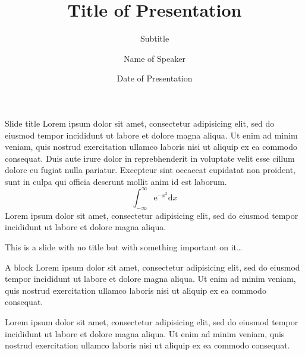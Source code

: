 \documentclass[aspectratio=169]{beamer}
\title[Short Title]{Title of Presentation}
\subtitle{Subtitle}
\author{Name of Speaker}
\institute{Job Title or Affiliation}
\date{Date of Presentation}
\begin{document}



\begin{frame}[leftcolor=BrightLime,rightcolor=DarkLime,div=0.8\paperwidth]
  \titlepage
\end{frame}


\begin{frame}{Slide title}
  Lorem ipsum dolor sit amet, consectetur adipisicing elit, sed do eiusmod
  tempor incididunt ut labore et dolore magna aliqua. Ut enim ad minim veniam,
  quis nostrud exercitation ullamco laboris nisi ut aliquip ex ea commodo
  consequat. Duis aute irure dolor in reprebhenderit in voluptate velit esse
  cillum dolore eu fugiat nulla pariatur. Excepteur sint occaecat cupidatat non
  proident, sunt in culpa qui officia deserunt mollit anim id est laborum.
  \begin{equation*}
    \int_{-\infty}^{\infty}\mathrm{e}^{-x^2}\mathrm{d}x
  \end{equation*}
  Lorem ipsum dolor sit amet, consectetur adipisicing elit, sed do eiusmod
  tempor incididunt ut labore et dolore magna aliqua.
\end{frame}

\begin{frame}
  This is a slide with no title but with something important on it\ldots

  \begin{block}{A block}
    Lorem ipsum dolor sit amet, consectetur adipisicing elit, sed do eiusmod
    tempor incididunt ut labore et dolore magna aliqua. Ut enim ad minim veniam,
    quis nostrud exercitation ullamco laboris nisi ut aliquip ex ea commodo
    consequat.
  \end{block}

  \begin{theorem}[My theorem]
    Lorem ipsum dolor sit amet, consectetur adipisicing elit, sed do eiusmod
    tempor incididunt ut labore et dolore magna aliqua. Ut enim ad minim veniam,
    quis nostrud exercitation ullamco laboris nisi ut aliquip ex ea commodo
    consequat.
  \end{theorem}
\end{frame}
\end{document}
